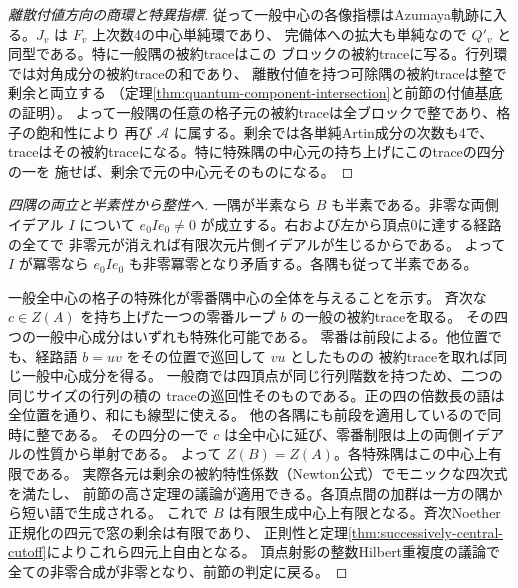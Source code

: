 \begin{proof}[離散付値方向の商環と特異指標]
従って一般中心の各像指標はAzumaya軌跡に入る。$J_v$ は $F_v$ 上次数4の中心単純環であり、
完備体への拡大も単純なので $Q'_v$ と同型である。特に一般隅の被約traceはこの
ブロックの被約traceに写る。行列環では対角成分の被約traceの和であり、
離散付値を持つ可除隅の被約traceは整で剰余と両立する
（定理\ref{thm:quantum-component-intersection}と前節の付値基底の証明）。
よって一般隅の任意の格子元の被約traceは全ブロックで整であり、格子の飽和性により
再び $\mathcal A$ に属する。剰余では各単純Artin成分の次数も4で、
traceはその被約traceになる。特に特殊隅の中心元の持ち上げにこのtraceの四分の一を
施せば、剰余で元の中心元そのものになる。
\end{proof}

\begin{proof}[四隅の両立と半素性から整性へ]
一隅が半素なら $B$ も半素である。非零な両側イデアル $I$ について
$e_0 I e_0\ne0$ が成立する。右および左から頂点0に達する経路の全てで
非零元が消えれば有限次元片側イデアルが生じるからである。
よって $I$ が冪零なら $e_0 I e_0$ も非零冪零となり矛盾する。各隅も従って半素である。

一般全中心の格子の特殊化が零番隅中心の全体を与えることを示す。
斉次な $c\in Z(A)$ を持ち上げた一つの零番ループ $b$ の一般の被約traceを取る。
その四つの一般中心成分はいずれも特殊化可能である。
零番は前段による。他位置でも、経路語 $b=u v$ をその位置で巡回して $v u$ としたものの
被約traceを取れば同じ一般中心成分を得る。
一般商では四頂点が同じ行列階数を持つため、二つの同じサイズの行列の積の
traceの巡回性そのものである。正の四の倍数長の語は全位置を通り、和にも線型に使える。
他の各隅にも前段を適用しているので同時に整である。
その四分の一で $c$ は全中心に延び、零番制限は上の両側イデアルの性質から単射である。
よって $Z(B)=Z(A)$。各特殊隅はこの中心上有限である。
実際各元は剰余の被約特性係数（Newton公式）でモニックな四次式を満たし、
前節の高さ定理の議論が適用できる。各頂点間の加群は一方の隅から短い語で生成される。
これで $B$ は有限生成中心上有限となる。斉次Noether正規化の四元で窓の剰余は有限であり、
正則性と定理\ref{thm:successively-central-cutoff}によりこれら四元上自由となる。
頂点射影の整数Hilbert重複度の議論で全ての非零合成が非零となり、前節の判定に戻る。
\end{proof}
